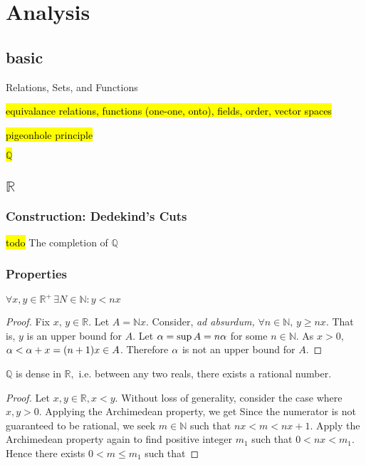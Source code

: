 \chapter{Analysis}

\section{basic}
Relations, Sets, and Functions

\hl{equivalance relations, functions (one-one, onto), fields, order, vector spaces}

\hl{pigeonhole principle}

\hl{$\mathbb{Q}$}

\section{$\mathbb{R}$}

\subsection{Construction: Dedekind's Cuts}
\hl{todo} The completion of $\mathbb{Q}$

\subsection{Properties}
\begin{theorem}
   $\forall x,y\in\mathbb{R}^+\,\exists N\in\mathbb{N}:y<nx$ 
\end{theorem}
\begin{proof}
   Fix $x,\,y\in\mathbb{R}$. Let $A=\mathbb{N}x$. Consider, \textit{ad absurdum,} $\forall n\in\mathbb{N},\,y\geq nx.$ That is, $y$ is an upper bound for $A.$ Let $\alpha=\sup{A}=n\alpha$ for some $n\in\mathbb{N}.$ As $x>0,$ $\alpha<\alpha+x=(n+1)x\in A$. Therefore $\alpha$ is not an upper bound for $A.$
\end{proof}

\begin{theorem}
   $\mathbb{Q}$ is dense in $\mathbb{R},$ i.e. between any two reals, there exists a rational number.
\end{theorem}
\begin{proof}
   Let $x,y\in\mathbb{R},x<y.$ Without loss of generality, consider the case where $x,y>0.$ Applying the Archimedean property, we get
   Since the numerator is not guaranteed to be rational, we seek $m\in\mathbb{N}$ such that $nx<m<nx+1$. Apply the Archimedean property again to find positive integer $m_1$ such that $0<nx<m_1.$ Hence there exists $0<m\leq m_1$ such that
\end{proof}

